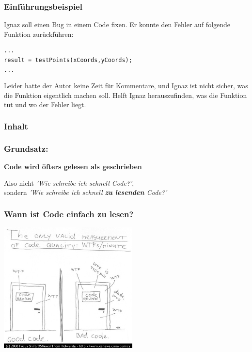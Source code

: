 \documentclass{beamer}
\begin{document}
\begin{frame}[fragile]
    \frametitle{Einführungsbeispiel}
    Ignaz soll einen Bug in einem Code fixen. Er konnte den Fehler auf folgende
    Funktion zurückführen:
\begin{lstlisting}
...
result = testPoints(xCoords,yCoords);
...
\end{lstlisting}
Leider hatte der Autor keine Zeit für Kommentare, und Ignaz ist nicht sicher,
was die Funktion eigentlich machen soll. Helft Ignaz herauszufinden,
was die Funktion  tut und wo der Fehler liegt.
\end{frame}

\begin{frame}
    \frametitle{Inhalt}
    \tableofcontents
\end{frame}



\begin{frame}
    \frametitle{Grundsatz:}
    \begin{center}
        \huge \bf Code wird öfters gelesen als geschrieben
    \end{center}
    \vspace{2em}\pause
    Also nicht \textit{'Wie schreibe ich schnell Code?'}, \\
    sondern \textit{'Wie schreibe ich schnell \textbf{zu lesenden} Code?'}
\end{frame}

\begin{frame}
    \frametitle{Wann ist Code einfach zu lesen?}
    \begin{center}
        \includegraphics[width=7cm]{wtfm.jpg}
    \end{center}
\end{frame}
\end{document}
